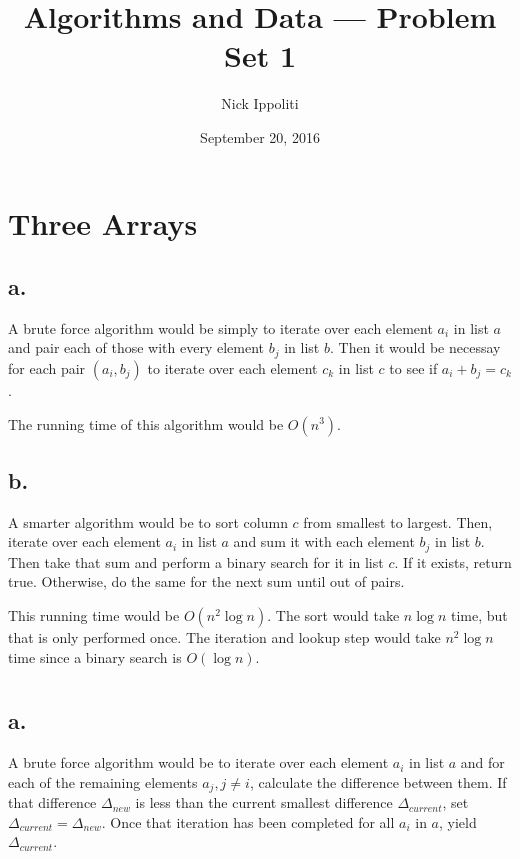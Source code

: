 \documentclass[14pt, letterpaper]{article}
\title{Algorithms and Data --- Problem Set 1}
\author{Nick Ippoliti}
\date{September 20, 2016}
\begin{document}
\begin{titlepage}
	\maketitle
\end{titlepage}

\section{Three Arrays}
\subsection{a.}
A brute force algorithm would be simply to iterate over each element $a_i$ in 
list $a$ and pair each of those with every element $b_j$ in list $b$. Then it
would be necessay for each pair $(a_i, b_j)$ to iterate over each element $c_k$
in list $c$ to see if $a_i + b_j = c_k$.

The running time of this algorithm would be $O(n^3)$.

\subsection{b.}
A smarter algorithm would be to sort column $c$ from smallest to largest. Then,
iterate over each element $a_i$ in list $a$ and sum it with each element $b_j$
in list $b$. Then take that sum and perform a binary search for it in list $c$.
If it exists, return true. Otherwise, do the same for the next sum until out of
pairs.

This running time would be $O(n^2 \log n)$. The sort would take $n \log n$
time, but that is only performed once. The iteration and lookup step would take
$n^2 \log n$ time since a binary search is $O(\log n)$.

\section{}
\subsection{a.}
A brute force algorithm would be to iterate over each element $a_i$ in list $a$
and for each of the remaining elements $a_j, j \neq i$, calculate the difference
between them. If that difference $\Delta_{new}$ is less than the current 
smallest difference $\Delta_{current}$, set $\Delta_{current} =  \Delta_{new}$.
Once that iteration has been completed for all $a_i$ in $a$, yield 
$\Delta_{current}$.
\end{document}
